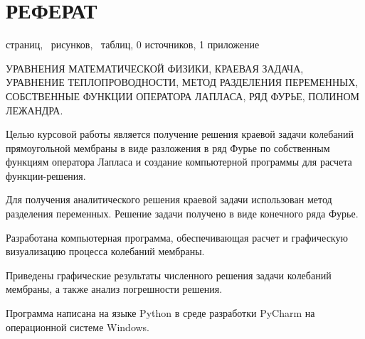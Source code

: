 \section*{РЕФЕРАТ}{
	\begin{center}
	\pageref{LastPage} страниц,
	\totalfigures\ рисунков,
	\totaltables\ таблиц,
	0 источников,
	1 приложение
	\end{center}
	
    \begin{center}
       УРАВНЕНИЯ МАТЕМАТИЧЕСКОЙ ФИЗИКИ, КРАЕВАЯ  ЗАДАЧА, УРАВНЕНИЕ ТЕПЛОПРОВОДНОСТИ,
        МЕТОД РАЗДЕЛЕНИЯ ПЕРЕМЕННЫХ, СОБСТВЕННЫЕ ФУНКЦИИ ОПЕРАТОРА ЛАПЛАСА, РЯД 
        ФУРЬЕ, ПОЛИНОМ ЛЕЖАНДРА.     
    \end{center}
    

Целью курсовой работы является получение решения краевой задачи колебаний прямоугольной мембраны в виде разложения в ряд Фурье по собственным функциям оператора Лапласа и создание компьютерной программы для расчета функции-решения.

Для  получения  аналитического  решения  краевой  задачи  использован 
метод разделения переменных. Решение задачи получено в виде конечного ряда Фурье.

Разработана  компьютерная  программа,  обеспечивающая  расчет  и 
графическую  визуализацию  процесса колебаний мембраны.

Приведены  графические  результаты  численного  решения  задачи колебаний мембраны, а также анализ погрешности решения.

Программа  написана  на  языке Python в  среде  разработки PyCharm на операционной системе Windows. 

}

\newpage
\tableofcontents
\newpage
{}
{}

